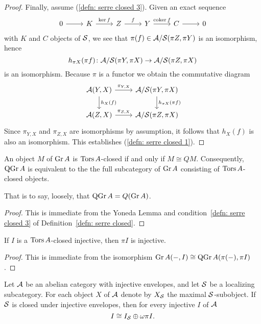 \begin{proof}
  Finally, assume (\ref{defn: serre closed 3}).
  Given an exact sequence
  \[\begin{tikzcd}
  0 \arrow{r} & K \arrow{r}{\op{ker} f} & Z \arrow{r}{f} & Y \arrow{r}{\op{coker} f} & C \arrow{r} & 0
  \end{tikzcd}\]
  with \(K\) and \(C\) objects of \(\mathcal{S}\), we see that \(\pi(f) \in \mathcal{A}/\mathcal{S}(\pi Z, \pi Y)\) is an isomorphism, hence
  \[h_{\pi X}(\pi f) \colon \mathcal{A}/\mathcal{S}(\pi Y, \pi X) \to \mathcal{A}/\mathcal{S}(\pi Z,\pi X)\]
  is an isomorphism.
  Because \(\pi\) is a functor we obtain the commutative diagram
  \[\begin{tikzcd}
  \A(Y,X) \arrow{r}{\pi_{Y,X}}\arrow{d}{h_X(f)} & \A/\Serre(\pi Y, \pi X) \arrow{d}{h_{\pi X}(\pi f)}\\
  \A(Z,X) \arrow{r}{\pi_{Z,X}} & \A/\Serre(\pi Z,\pi X)
  \end{tikzcd}\]
  Since \(\pi_{Y,X}\) and \(\pi_{Z,X}\) are isomorphisms by assumption, it follows that \(h_X(f)\) is also an isomorphism.
  This establishes (\ref{defn: serre closed 1}).
\end{proof}

\begin{lemma}
  An object \(M\) of \(\operatorname{Gr}A\) is \(\operatorname{Tors}A\)-closed if and only if \(M \cong QM\).
  Consequently, \(\operatorname{QGr}A\) is equivalent to the the full subcategory of \(\operatorname{Gr}A\) consisting of \(\operatorname{Tors}A\)-closed objects.

  That is to say, loosely, that \(\operatorname{QGr}A = Q(\operatorname{Gr}A)\).
\end{lemma}
\begin{proof}
  This is immediate from the Yoneda Lemma and condition~\ref{defn: serre closed 3} of Definition~\ref{defn: serre closed}.
\end{proof}

\begin{lemma}
  If \(I\) is a \(\operatorname{Tors}A\)-closed injective, then \(\pi{I}\) is injective.
\end{lemma}

\begin{proof}
  This is immediate from the isomorphism \(\operatorname{Gr}A(-, I) \cong \operatorname{QGr}A(\pi(-), \pi{I})\).
\end{proof}

\begin{proposition}\label{prop: decomposition of injectives}
  Let \(\mathcal{A}\) be an abelian category with injective envelopes, and let \(\mathcal{S}\) be a localizing subcategory.
  For each object \(X\) of \(\mathcal{A}\) denote by \(X_{\mathcal{S}}\) the maximal \(\mathcal{S}\)-subobject.
  If \(\mathcal{S}\) is closed under injective envelopes, then for every injective \(I\) of \(\mathcal{A}\)
  \[I \cong I_{\mathcal{S}} \oplus \omega\pi{I}.\]
\end{proposition}

